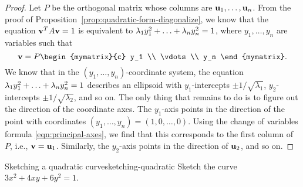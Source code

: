 \begin{proof}
  Let $P$ be the orthogonal matrix whose columns are
  $\vect{u}_1,\ldots,\vect{u}_n$. From the proof of
  Proposition~\ref{prop:quadratic-form-diagonalize}, we know that the
  equation $\vect{v}^TA\vect{v} = 1$ is equivalent to
  $\lambda_1y_1^2 + \ldots + \lambda_ny_n^2=1$, where
  $y_1,\ldots,y_n$ are variables such that
  \begin{equation}\label{eqn:principal-axes}
    \vect{v} = P\begin{mymatrix}{c} y_1 \\ \vdots \\ y_n \end{mymatrix}.
  \end{equation}
  We know that in the $(y_1,\ldots,y_n)$-coordinate system, the
  equation $\lambda_1y_1^2 + \ldots + \lambda_ny_n^2 = 1$
  describes an ellipsoid with $y_1$-intercepts
  $\pm1/\sqrt{\lambda_1}$, $y_2$-intercepts $\pm1/\sqrt{\lambda_2}$,
  and so on. The only thing that remains to do is to figure out the
  direction of the coordinate axes. The $y_1$-axis points in the
  direction of the point with coordinates
  $(y_1,\ldots,y_n) = (1,0,\ldots,0)$.  Using the change of variables
  formula {\eqref{eqn:principal-axes}}, we find that this corresponds
  to the first column of $P$, i.e., $\vect{v}=\vect{u}_1$. Similarly, the
  $y_2$-axis points in the direction of $\vect{u}_2$, and so on.
\end{proof}

\begin{example}{Sketching a quadratic curve}{sketching-quadratic}
  Sketch the curve $3x^2 + 4xy + 6y^2 = 1$.
\end{example}

